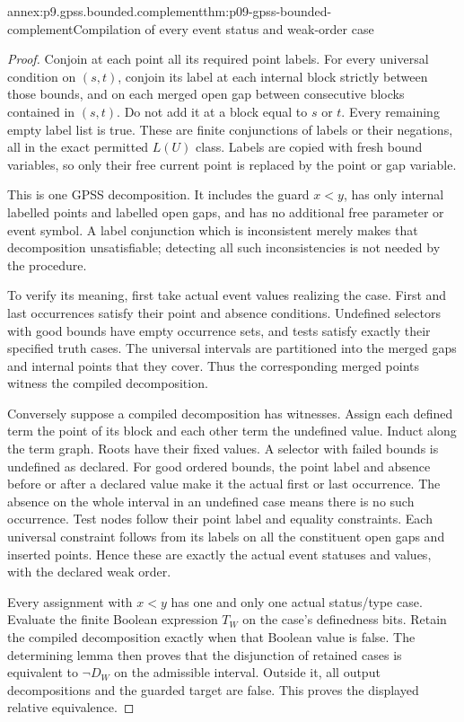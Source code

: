 \begin{annexitem}{annex:p9.gpss.bounded.complement}{thm:p09-gpss-bounded-complement}{Compilation of every event status and weak-order case}
\begin{proof}
Conjoin at each point all
its required point labels.
For every universal condition
on \((s,t)\), conjoin its
label at each internal block
strictly between those bounds,
and on each merged open gap
between consecutive blocks
contained in \((s,t)\).
Do not add it at a block
equal to \(s\) or \(t\).
Every remaining empty label
list is true. These are
finite conjunctions of labels
or their negations, all in
the exact permitted \(L(U)\)
class. Labels are copied with
fresh bound variables, so
only their free current point
is replaced by the point or
gap variable.

This is one GPSS decomposition.
It includes the guard \(x<y\),
has only internal labelled
points and labelled open
gaps, and has no additional
free parameter or event
symbol. A label conjunction
which is inconsistent merely
makes that decomposition
unsatisfiable; detecting all
such inconsistencies is not
needed by the procedure.

To verify its meaning, first
take actual event values
realizing the case. First
and last occurrences satisfy
their point and absence
conditions. Undefined
selectors with good bounds
have empty occurrence sets,
and tests satisfy exactly
their specified truth cases.
The universal intervals
are partitioned into the
merged gaps and internal
points that they cover.
Thus the corresponding
merged points witness the
compiled decomposition.

Conversely suppose a compiled
decomposition has witnesses.
Assign each defined term
the point of its block and
each other term the undefined
value. Induct along the term
graph. Roots have their fixed
values. A selector with failed
bounds is undefined as declared.
For good ordered bounds, the
point label and absence before
or after a declared value make
it the actual first or last
occurrence. The absence on the
whole interval in an undefined
case means there is no such
occurrence. Test nodes follow
their point label and equality
constraints. Each universal
constraint follows from its
labels on all the constituent
open gaps and inserted points.
Hence these are exactly the
actual event statuses and
values, with the declared
weak order.

Every assignment with \(x<y\)
has one and only one actual
status/type case. Evaluate
the finite Boolean expression
\(T_W\) on the case's
definedness bits. Retain the
compiled decomposition exactly
when that Boolean value is
false. The determining lemma
then proves that the disjunction
of retained cases is equivalent
to \(\neg D_W\) on the
admissible interval. Outside
it, all output decompositions
and the guarded target are
false. This proves the
displayed relative equivalence.


\end{proof}
\end{annexitem}
